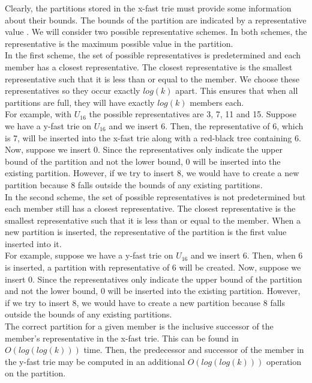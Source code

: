 \documentclass{article}
\begin{document}
\noindent
Clearly, the partitions stored in the x-fast trie must provide some information about their bounds. The bounds of the partition are indicated by a representative value \cite{WILLARD198381}. We will consider two possible representative schemes. In both schemes, the representative is the maximum possible value in the partition.
\\

\noindent
In the first scheme, the set of possible representatives is predetermined and each member has a closest representative. The closest representative is the smallest representative such that it is less than or equal to the member. We choose these representatives so they occur exactly $log(k)$ apart. This ensures that when all partitions are full, they will have exactly $log(k)$ members each.  
\\

\noindent
For example, with $U_{16}$ the possible representatives are 3, 7, 11 and 15. Suppose we have a y-fast trie on $U_{16}$ and we insert 6. Then, the representative of 6, which is 7, will be inserted into the x-fast trie along with a red-black tree containing 6. Now, suppose we insert 0. Since the representatives only indicate the upper bound of the partition and not the lower bound, 0 will be inserted into the existing partition. However, if we try to insert 8, we would have to create a new partition because 8 falls outside the bounds of any existing partitions. 
\\

\noindent
In the second scheme, the set of possible representatives is not predetermined but each member still has a closest representative. The closest representative is the smallest representative such that it is less than or equal to the member. When a new partition is inserted, the representative of the partition is the first value inserted into it.
\\

\noindent
For example, suppose we have a y-fast trie on $U_{16}$ and we insert 6. Then, when 6 is inserted, a partition with representative of 6 will be created. Now, suppose we insert 0. Since the representatives only indicate the upper bound of the partition and not the lower bound, 0 will be inserted into the existing partition. However, if we try to insert 8, we would have to create a new partition because 8 falls outside the bounds of any existing partitions. 
\\

\noindent
The correct partition for a given member is the inclusive successor of the member's representative in the x-fast trie. This can be found in $O(log(log(k)))$ time. Then, the predecessor and successor of the member in the y-fast trie may be computed in an additional $O(log(log(k)))$ operation on the partition. 
\end{document}
